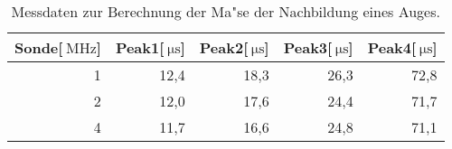 \begin{table}[!h]
\begin{center}
\begin{tabular}{|r|r|r|r|r|}
\hline
Sonde[$\SI{}{\mega\hertz}$] & Peak1[$\SI{}{\micro\second}$] & Peak2[$\SI{}{\micro\second}$] & Peak3[$\SI{}{\micro\second}$] & Peak4[$\SI{}{\micro\second}$]\\
\hline
\hline
1 &	12,4 &	18,3 &	26,3 &	72,8\\
2 &	12,0 &	17,6 &	24,4 &	71,7\\
4 &	11,7 &	16,6 &	24,8 &	71,1\\
\hline
\end{tabular}
\caption[]{Messdaten zur Berechnung der Ma"se der Nachbildung eines Auges.}
\label{auge1}
\end{center}
\end{table}